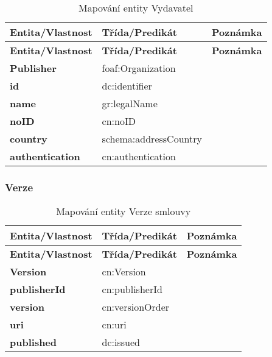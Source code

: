 \begin{center}
\begin{longtable}{lll}
\label{grid_mlmmh} \\
\multicolumn{1}{l}{\textbf{Entita/Vlastnost}} & 
\multicolumn{1}{l}{\textbf{Třída/Predikát}} & 
\multicolumn{1}{l}{\textbf{Poznámka}} \\ \hline 
\endfirsthead
\multicolumn{1}{l}{\textbf{Entita/Vlastnost}} & 
\multicolumn{1}{l}{\textbf{Třída/Predikát}} & 
\multicolumn{1}{l}{\textbf{Poznámka}} \\ \hline 
\hline
\endhead
\endfoot
\caption{Mapování entity Vydavatel}
\endlastfoot
\textbf{Publisher} & foaf:Organization \\
\textbf{id} & dc:identifier \\
\textbf{name} & gr:legalName \\
\textbf{noID} & cn:noID \\
\textbf{country} & schema:addressCountry \\
\textbf{authentication} & cn:authentication \\
\end{longtable}
\end{center}

\subsubsection*{Verze}

\begin{center}
\begin{longtable}{lll}
\label{grid_mlmmh} \\
\multicolumn{1}{l}{\textbf{Entita/Vlastnost}} & 
\multicolumn{1}{l}{\textbf{Třída/Predikát}} & 
\multicolumn{1}{l}{\textbf{Poznámka}} \\ \hline 
\endfirsthead
\multicolumn{1}{l}{\textbf{Entita/Vlastnost}} & 
\multicolumn{1}{l}{\textbf{Třída/Predikát}} & 
\multicolumn{1}{l}{\textbf{Poznámka}} \\ \hline 
\hline
\endhead
\endfoot
\caption{Mapování entity Verze smlouvy}
\endlastfoot
\textbf{Version} & cn:Version \\
\textbf{publisherId} & cn:publisherId \\
\textbf{version} & cn:versionOrder \\
\textbf{uri} & cn:uri \\
\textbf{published} & dc:issued \\
\end{longtable}
\end{center}

